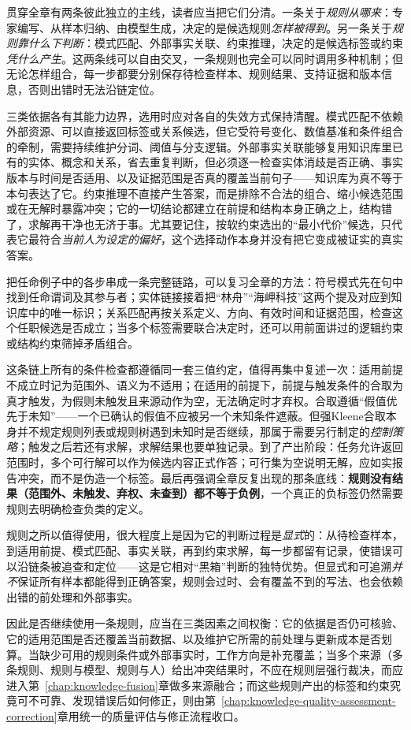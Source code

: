 贯穿全章有两条彼此独立的主线，读者应当把它们分清。一条关于\emph{规则从哪来}：专家编写、从样本归纳、由模型生成，决定的是候选规则\emph{怎样被得到}。另一条关于\emph{规则靠什么下判断}：模式匹配、外部事实关联、约束推理，决定的是候选标签或约束\emph{凭什么产生}。这两条线可以自由交叉，一条规则也完全可以同时调用多种机制；但无论怎样组合，每一步都要分别保存待检查样本、规则结果、支持证据和版本信息，否则出错时无法沿链定位。

三类依据各有其能力边界，选用时应对各自的失效方式保持清醒。模式匹配不依赖外部资源、可以直接返回标签或关系候选，但它受符号变化、数值基准和条件组合的牵制，需要持续维护分词、阈值与分支逻辑。外部事实关联能够复用知识库里已有的实体、概念和关系，省去重复判断，但必须逐一检查实体消歧是否正确、事实版本与时间是否适用、以及证据范围是否真的覆盖当前句子——知识库为真不等于本句表达了它。约束推理不直接产生答案，而是排除不合法的组合、缩小候选范围或在无解时暴露冲突；它的一切结论都建立在前提和结构本身正确之上，结构错了，求解再干净也无济于事。尤其要记住，按软约束选出的“最小代价”候选，只代表它最符合\emph{当前人为设定的偏好}，这个选择动作本身并没有把它变成被证实的真实答案。

把任命例子中的各步串成一条完整链路，可以复习全章的方法：符号模式先在句中找到任命谓词及其参与者；实体链接接着把“林舟”“海岬科技”这两个提及对应到知识库中的唯一标识；关系匹配再按关系定义、方向、有效时间和证据范围，检查这个任职候选是否成立；当多个标签需要联合决定时，还可以用前面讲过的逻辑约束或结构约束筛掉矛盾组合。

这条链上所有的条件检查都遵循同一套三值约定，值得再集中复述一次：适用前提不成立时记为范围外、语义为不适用；在适用的前提下，前提与触发条件的合取为真才触发，为假则未触发且来源动作为空，无法确定时才弃权。合取遵循“假值优先于未知”——一个已确认的假值不应被另一个未知条件遮蔽。但强Kleene合取本身并不规定规则列表或规则树遇到未知时是否继续，那属于需要另行制定的\emph{控制策略}；触发之后若还有求解，求解结果也要单独记录。到了产出阶段：任务允许返回范围时，多个可行解可以作为候选内容正式作答；可行集为空说明无解，应如实报告冲突，而不是伪造一个标签。最后再强调全章反复出现的那条底线：\textbf{规则没有结果（范围外、未触发、弃权、未查到）都不等于负例}，一个真正的负标签仍然需要规则去明确检查负类的定义。

规则之所以值得使用，很大程度上是因为它的判断过程是\emph{显式}的：从待检查样本，到适用前提、模式匹配、事实关联，再到约束求解，每一步都留有记录，使错误可以沿链条被追查和定位——这是它相对“黑箱”判断的独特优势。但显式和可追溯\emph{并不}保证所有样本都能得到正确答案，规则会过时、会有覆盖不到的写法、也会依赖出错的前处理和外部事实。

因此是否继续使用一条规则，应当在三类因素之间权衡：它的依据是否仍可核验、它的适用范围是否还覆盖当前数据、以及维护它所需的前处理与更新成本是否划算。当缺少可用的规则条件或外部事实时，工作方向是补充覆盖；当多个来源（多条规则、规则与模型、规则与人）给出冲突结果时，不应在规则层强行裁决，而应进入第~\ref{chap:knowledge-fusion}章做多来源融合；而这些规则产出的标签和约束究竟可不可靠、发现错误后如何修正，则由第~\ref{chap:knowledge-quality-assessment-correction}章用统一的质量评估与修正流程收口。
